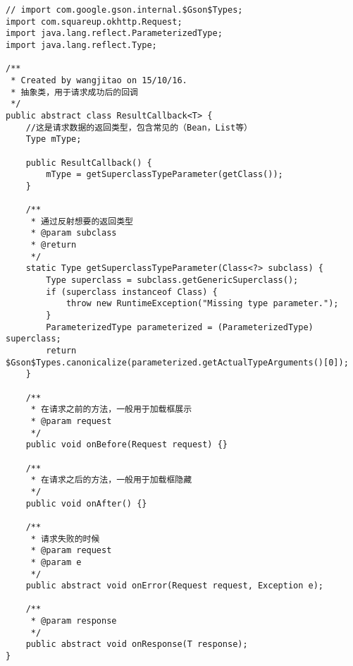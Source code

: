 \documentclass[9pt, b5paper]{article}
\begin{document}
\begin{verbatim}
// import com.google.gson.internal.$Gson$Types;
import com.squareup.okhttp.Request;
import java.lang.reflect.ParameterizedType;
import java.lang.reflect.Type;
 
/**
 * Created by wangjitao on 15/10/16.
 * 抽象类，用于请求成功后的回调
 */
public abstract class ResultCallback<T> {
    //这是请求数据的返回类型，包含常见的（Bean，List等）
    Type mType;
 
    public ResultCallback() {
        mType = getSuperclassTypeParameter(getClass());
    }
 
    /**
     * 通过反射想要的返回类型
     * @param subclass
     * @return
     */
    static Type getSuperclassTypeParameter(Class<?> subclass) {
        Type superclass = subclass.getGenericSuperclass();
        if (superclass instanceof Class) {
            throw new RuntimeException("Missing type parameter.");
        }
        ParameterizedType parameterized = (ParameterizedType) superclass;
        return $Gson$Types.canonicalize(parameterized.getActualTypeArguments()[0]);
    }
 
    /**
     * 在请求之前的方法，一般用于加载框展示
     * @param request
     */
    public void onBefore(Request request) {}
 
    /**
     * 在请求之后的方法，一般用于加载框隐藏
     */
    public void onAfter() {}
 
    /**
     * 请求失败的时候
     * @param request
     * @param e
     */
    public abstract void onError(Request request, Exception e);
 
    /**
     * @param response
     */
    public abstract void onResponse(T response);
}
\end{verbatim}
\end{document}
